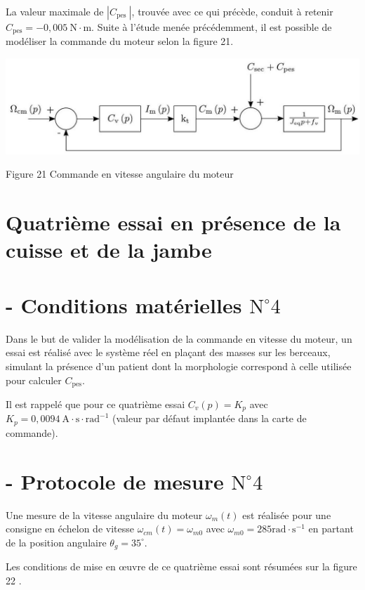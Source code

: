 \documentclass[10pt]{article}
\begin{document}
La valeur maximale de $\left|C_{\text {pes }}\right|$, trouvée avec ce qui précède, conduit à retenir $C_{\mathrm{pes}}=-0,005 \mathrm{~N} \cdot \mathrm{m}$. Suite à l'étude menée précédemment, il est possible de modéliser la commande du moteur selon la figure 21.

\begin{center}
\includegraphics[max width=\textwidth]{2024_07_14_a83aebba33898893d39fg-13}
\end{center}

Figure 21 Commande en vitesse angulaire du moteur

\section*{Quatrième essai en présence de la cuisse et de la jambe}
\section*{- Conditions matérielles $\mathrm{N}^{\circ} 4$}
Dans le but de valider la modélisation de la commande en vitesse du moteur, un essai est réalisé avec le système réel en plaçant des masses sur les berceaux, simulant la présence d'un patient dont la morphologie correspond à celle utilisée pour calculer $C_{\mathrm{pes}}$.

Il est rappelé que pour ce quatrième essai $C_{v}(p)=K_{p}$ avec $K_{p}=0,0094 \mathrm{~A} \cdot \mathrm{s} \cdot \mathrm{rad}^{-1}$ (valeur par défaut implantée dans la carte de commande).

\section*{- Protocole de mesure $\mathrm{N}^{\circ} 4$}
Une mesure de la vitesse angulaire du moteur $\omega_{m}(t)$ est réalisée pour une consigne en échelon de vitesse $\omega_{c m}(t)=\omega_{m 0}$ avec $\omega_{m 0}=285 \mathrm{rad} \cdot \mathrm{s}^{-1}$ en partant de la position angulaire $\theta_{g}=35^{\circ}$.

Les conditions de mise en œuvre de ce quatrième essai sont résumées sur la figure 22 .
\end{document}

